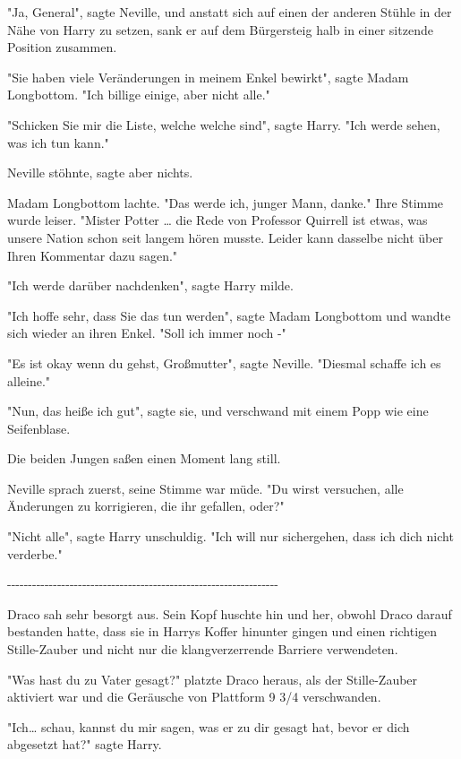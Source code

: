{"Ja, General", sagte Neville, und anstatt sich auf einen der anderen Stühle in der Nähe von Harry zu setzen, sank er auf dem Bürgersteig halb in einer sitzende Position zusammen.

"Sie haben viele Veränderungen in meinem Enkel bewirkt", sagte Madam Longbottom. "Ich billige einige, aber nicht alle."

"Schicken Sie mir die Liste, welche welche sind", sagte Harry. "Ich werde sehen, was ich tun kann."

Neville stöhnte, sagte aber nichts.

Madam Longbottom lachte. "Das werde ich, junger Mann, danke." Ihre Stimme wurde leiser. "Mister Potter … die Rede von Professor Quirrell ist etwas, was unsere Nation schon seit langem hören musste. Leider kann dasselbe nicht über Ihren Kommentar dazu sagen."

"Ich werde darüber nachdenken", sagte Harry milde.

"Ich hoffe sehr, dass Sie das tun werden", sagte Madam Longbottom und wandte sich wieder an ihren Enkel. "Soll ich immer noch -"

"Es ist okay wenn du gehst, Großmutter", sagte Neville. "Diesmal schaffe ich es alleine."

"Nun, das heiße ich gut", sagte sie, und verschwand mit einem Popp wie eine Seifenblase.

Die beiden Jungen saßen einen Moment lang still.

Neville sprach zuerst, seine Stimme war müde. "Du wirst versuchen, alle Änderungen zu korrigieren, die ihr gefallen, oder?"

"Nicht alle", sagte Harry unschuldig. "Ich will nur sichergehen, dass ich dich nicht verderbe."

-\/-\/-\/-\/-\/-\/-\/-\/-\/-\/-\/-\/-\/-\/-\/-\/-\/-\/-\/-\/-\/-\/-\/-\/-\/-\/-\/-\/-\/-\/-\/-\/-\/-\/-\/-\/-\/-\/-\/-\/-\/-\/-\/-\/-\/-\/-\/-\/-\/-\/-\/-\/-\/-\/-\/-\/-\/-\/-\/-\/-\/-\/-\/-\/-

Draco sah sehr besorgt aus. Sein Kopf huschte hin und her, obwohl Draco darauf bestanden hatte, dass sie in Harrys Koffer hinunter gingen und einen richtigen Stille-Zauber und nicht nur die klangverzerrende Barriere verwendeten.

"Was hast du zu Vater gesagt?" platzte Draco heraus, als der Stille-Zauber aktiviert war und die Geräusche von Plattform 9 3/4 verschwanden.

"Ich… schau, kannst du mir sagen, was er zu dir gesagt hat, bevor er dich abgesetzt hat?" sagte Harry.

}
